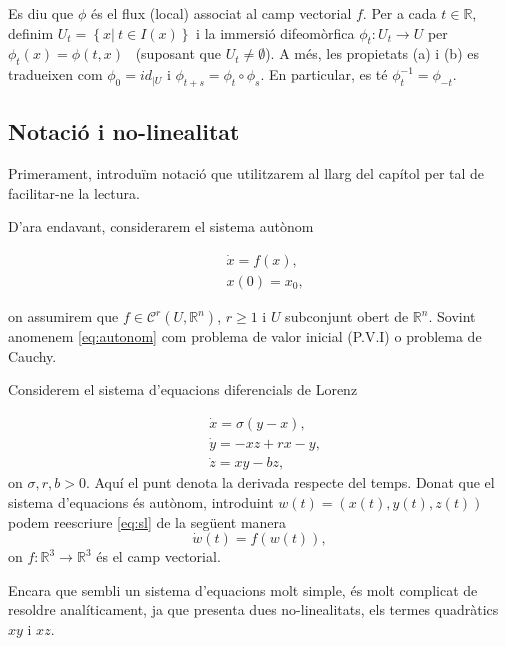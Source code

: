 \documentclass[11pt,a4paper,openright,oneside]{article}
\numberwithin{equation}{section}
\theoremstyle{definition}
\begin{document}
Es diu que $\phi$ és el flux (local) associat al camp vectorial $f$. Per a cada $t\in \mathbb{R}$, definim $U_t=\left\{x|\ t\in I(x) \right\}$ i la immersió difeomòrfica $\phi_t\colon U_t\rightarrow{U}$ per $\phi_t(x)=\phi(t,x)$ \ (suposant que $U_t\neq \emptyset$). A més, les propietats (a) i (b) es tradueixen com $\phi_0=id_{|U}$ i $\phi_{t+s}=\phi_t\circ \phi_s$. En particular, es té $\phi_{t}^{-1}=\phi_{-t}$.

\subsection{Notació i no-linealitat}
Primerament, introduïm notació que utilitzarem al llarg del capítol per tal de facilitar-ne la lectura.

D'ara endavant, considerarem el sistema autònom 

\begin{equation} \begin{aligned} \label{eq:autonom} 
    &\dot{x}=f(x),\\ 
    &x(0)=x_0,
\end{aligned} \end{equation}

on assumirem que $f\in \mathcal{C}^{r}(U, \mathbb{R}^{n})$, $r\geq1$ i $U$ subconjunt obert de $\mathbb{R}^{n}$. Sovint anomenem \eqref{eq:autonom} com problema de valor inicial (P.V.I) o problema de Cauchy.

Considerem el sistema d'equacions diferencials de Lorenz

\begin{equation} \begin{aligned} \label{eq:sl} 
    &\dot{x}=\sigma(y-x),\\ 
    &\dot{y}=-xz+rx-y,\\
    &\dot{z}=xy-bz,
\end{aligned} \end{equation}
on $\sigma,r,b>0$. Aquí el punt denota la derivada respecte del temps. Donat que el sistema d'equacions és autònom, introduint $w(t)=\left(x(t),y(t),z(t)\right)$ podem reescriure \eqref{eq:sl} de la següent manera 
\begin{equation} \label{eq: reescrita}
    \dot{w}(t)=f(w(t)),
\end{equation} on $f:\mathbb{R}^{3}\rightarrow{\mathbb{R}^{3}}$ és el camp vectorial.

Encara que sembli un sistema d'equacions molt simple, és molt complicat de resoldre analíticament, ja que presenta dues no-linealitats, els termes quadràtics $xy$ i $xz$. 
\end{document}
